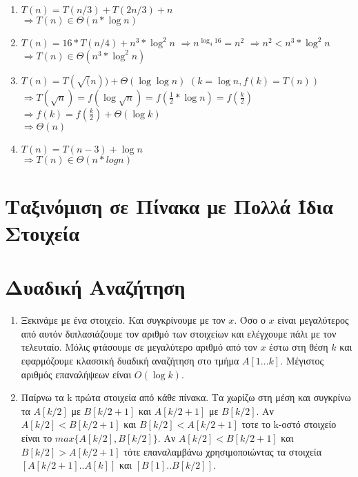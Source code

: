 \documentclass[a4paper,10pt]{article} \usepackage{anysize}
\begin{document}
\begin{enumerate}
\begin{enumerate}
\item $T(n) = T(n/3) + T(2n/3) + n$\\
$\Rightarrow T(n) \in \Theta(n*\log{n})$

\item $T(n) = 16*T(n/4) + n^3*\log^2{n}$
$\Rightarrow n^{\log _4{16}} = n^2$
$\Rightarrow n^2 < n^3*\log^2{n}$\\
$\Rightarrow T(n) \in \Theta(n^3*\log^2{n})$

\item $T(n) = T(\sqrt(n)) + \Theta(\log{\log{n}})$
$(k=\log{n},f(k)=T(n))$\\
$\Rightarrow
T(\sqrt{n})=f(\log{\sqrt{n}})=f(\frac{1}{2}*\log{n})=f(\frac{k}{2}) $\\
$\Rightarrow f(k)=f(\frac{k}{2})+\Theta(\log{k})$\\
$\Rightarrow \Theta(n)$

\item $T(n) = T(n-3) + \log{n}$\\
$\Rightarrow T(n) \in \Theta(n*logn)$

\end{enumerate}
\end{enumerate}

\section{Ταξινόμιση σε Πίνακα με Πολλά Ίδια Στοιχεία}

\section{Δυαδική Αναζήτηση}
\begin{enumerate}
\item Ξεκινάμε με ένα στοιχείο. Και συγκρίνουμε με τον $x$. Όσο ο $x$ είναι
μεγαλύτερος από αυτόν διπλασιάζουμε τον αριθμό των στοιχείων και ελέγχουμε
πάλι με τον τελευταίο. Μόλις φτάσουμε σε μεγαλύτερο αριθμό από τον $x$ έστω
στη θέση $k$ και εφαρμόζουμε κλασσική δυαδική αναζήτηση στο τμήμα $A[1...k]$. 
Μέγιστος αριθμός επαναλήψεων είναι $O(\log{k})$.
\item Παίρνω τα k πρώτα στοιχεία από κάθε πίνακα. Τα χωρίζω στη μέση και
συγκρίνω τα $A[k/2]$ με $B[k/2+1]$ και $A[k/2+1]$ με $B[k/2]$. Αν
$A[k/2]<B[k/2+1]$ και $B[k/2]<A[k/2+1]$ τοτε το k-οστό στοιχείο είναι το
$max\{A[k/2],B[k/2]\}$. Αν $A[k/2]<B[k/2+1]$ και $B[k/2]>A[k/2+1]$ τότε
επαναλαμβάνω χρησιμοποιώντας τα στοιχεία $[A[k/2+1]..A[k]]$ και
$[B[1]..B[k/2]]$.
\end{enumerate}
\end{document}

